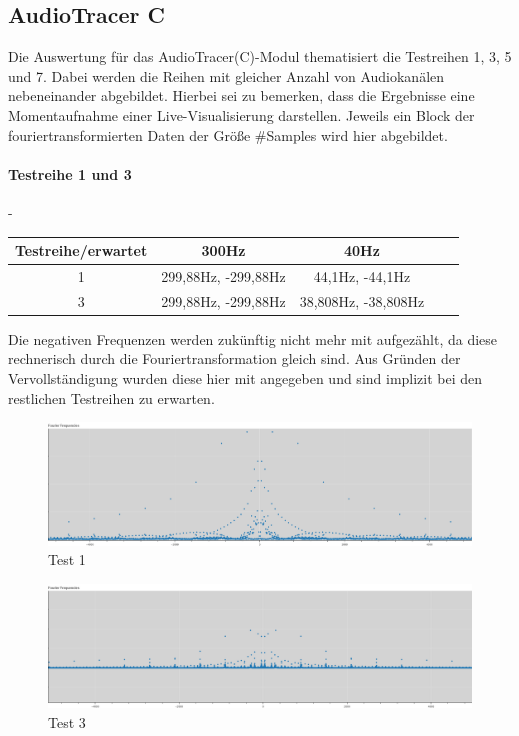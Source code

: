 \subsection{AudioTracer C}
Die Auswertung für das AudioTracer(C)-Modul thematisiert die Testreihen 1, 3, 5 und 7.
Dabei werden die Reihen mit gleicher Anzahl von Audiokanälen nebeneinander abgebildet.
Hierbei sei zu bemerken, dass die Ergebnisse eine Momentaufnahme einer Live-Visualisierung darstellen. Jeweils ein Block der fouriertransformierten Daten der Größe \#Samples wird hier abgebildet. 

\paragraph{Testreihe 1 und 3}
-
\begin{table}[h!]
	\centering
	\begin{tabular}{|c | c | c | c | c |}		
		\hline
		Testreihe/erwartet & 300Hz & 40Hz \\
		\hline\hline
		1		&	299,88Hz, -299,88Hz & 44,1Hz, -44,1Hz \\
		3		&	299,88Hz, -299,88Hz  &	38,808Hz, -38,808Hz	\\
		\hline	
	\end{tabular}	
\end{table}

Die negativen Frequenzen werden zukünftig nicht mehr mit aufgezählt, da diese rechnerisch durch die Fouriertransformation gleich sind. Aus Gründen der Vervollständigung wurden diese hier mit angegeben und sind implizit bei den restlichen Testreihen zu erwarten.

\begin{figure}[h!]
	\centering      
	\includegraphics[scale=0.34]{results/test1.png}
	\caption{Test 1}
	\label{fig:test1}
\end{figure}

\begin{figure}[h!]
	\centering      
	\includegraphics[scale=0.34]{results/test3.png}
	\caption{Test 3}
	\label{fig:test3}
\end{figure}

